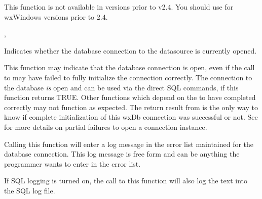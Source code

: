 This function is not available in versions prior to v2.4.  You should
use  for wxWindows
versions prior to 2.4.


, 

\label{wxdbisopen}


Indicates whether the database connection to the datasource is currently
opened.


This function may indicate that the database connection is open, even if
the call to  may have failed to fully
initialize the connection correctly.  The connection to the database
{\it is} open and can be used via the direct SQL commands, if this
function returns TRUE.  Other functions which depend on the
 to have completed correctly may not function
as expected.  The return result from  is the
only way to know if complete initialization of this wxDb connection was
successful or not.  See  for more details on
partial failures to open a connection instance.

\label{wxdblogerror}




Calling this function will enter a log message in the error list maintained
for the database connection.  This log message is free form and can be
anything the programmer wants to enter in the error list.

If SQL logging is turned on, the call to this function will also log the
text into the SQL log file.



\label{wxdbmodifycolumn}


